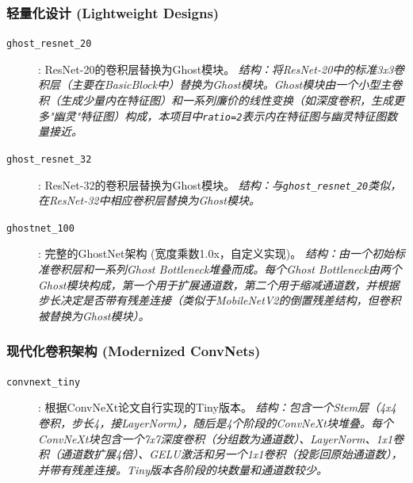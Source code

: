 \documentclass[a4paper]{article}
\begin{document}
\subsubsection{轻量化设计 (Lightweight Designs)}
\begin{description}
    \item[\texttt{ghost\_resnet\_20}]: ResNet-20的卷积层替换为Ghost模块。 \textit{结构：将ResNet-20中的标准3x3卷积层（主要在BasicBlock中）替换为Ghost模块。Ghost模块由一个小型主卷积（生成少量内在特征图）和一系列廉价的线性变换（如深度卷积，生成更多"幽灵"特征图）构成，本项目中\texttt{ratio=2}表示内在特征图与幽灵特征图数量接近。}
    \item[\texttt{ghost\_resnet\_32}]: ResNet-32的卷积层替换为Ghost模块。 \textit{结构：与\texttt{ghost\_resnet\_20}类似，在ResNet-32中相应卷积层替换为Ghost模块。}
    \item[\texttt{ghostnet\_100}]: 完整的GhostNet架构 (宽度乘数1.0x，自定义实现)。 \textit{结构：由一个初始标准卷积层和一系列Ghost Bottleneck堆叠而成。每个Ghost Bottleneck由两个Ghost模块构成，第一个用于扩展通道数，第二个用于缩减通道数，并根据步长决定是否带有残差连接（类似于MobileNetV2的倒置残差结构，但卷积被替换为Ghost模块）。}
\end{description}

\subsubsection{现代化卷积架构 (Modernized ConvNets)}
\begin{description}
    \item[\texttt{convnext\_tiny}]: 根据ConvNeXt论文自行实现的Tiny版本。 \textit{结构：包含一个Stem层（4x4卷积，步长4，接LayerNorm），随后是4个阶段的ConvNeXt块堆叠。每个ConvNeXt块包含一个7x7深度卷积（分组数为通道数）、LayerNorm、1x1卷积（通道数扩展4倍）、GELU激活和另一个1x1卷积（投影回原始通道数），并带有残差连接。Tiny版本各阶段的块数量和通道数较少。}
\end{description}
\end{document}
